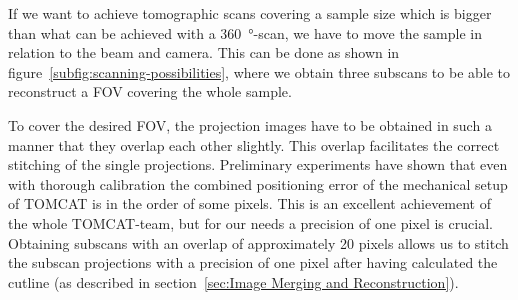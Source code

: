 %	
%
%	

If we want to achieve tomographic scans covering a sample size which is bigger than what can be achieved with a \SI{360}{\degree}-scan, we have to move the sample in relation to the beam and camera. This can be done as shown in figure~\ref{subfig:scanning-possibilities}, where we obtain three subscans to be able to reconstruct a FOV covering the whole sample.

%	

%	

To cover the desired FOV, the projection images have to be obtained in such a manner that they overlap each other slightly. This overlap facilitates the correct stitching of the single projections. Preliminary experiments have shown that even with thorough calibration the combined positioning error of the mechanical setup of TOMCAT is in the order of some pixels. This is an excellent achievement of the whole TOMCAT-team, but for our needs a precision of one pixel is crucial. Obtaining subscans with an overlap of approximately 20 pixels allows us to stitch the subscan projections with a precision of one pixel after having calculated the cutline (as described in section~\ref{sec:Image Merging and Reconstruction}).

